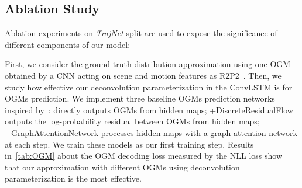 \documentclass[10pt,twocolumn,letterpaper]{article}
\begin{document}
\begin{table}
    \centering
{}
	\vspace{-0.2cm}
	\caption{Results on the inD in the long-term 30-second prediction.}
	\label{tab:inD}
\end{table}


\subsection{Ablation Study}
Ablation experiments on \textit{TrajNet} split are used to expose the significance of different components of our model:

 First, we consider the ground-truth distribution approximation using one OGM obtained by a CNN acting on scene and motion features as R2P2~\cite{rhinehart2018r2p2}. Then, we study how effective our deconvolution parameterization in the ConvLSTM is for OGMs prediction. We implement three baseline OGMs prediction networks inspired by~\cite{ridel2020scene,jain2020discrete,park2020diverse}:  directly outputs OGMs from hidden maps; +DiscreteResidualFlow outputs the log-probability residual between OGMs from hidden maps; +GraphAttentionNetwork processes hidden maps with a graph attention network at each step. We train these models as our first training step. Results in~\cref{tab:OGM} about the OGM decoding loss measured by the NLL loss show that our approximation with different OGMs using deconvolution parameterization is the most effective. 

\begin{table}
    \centering
	\vspace{-0.2cm}
	\caption{Comparison of four baselines and our method with close parameter numbers in predicting OGMs.}
	\label{tab:OGM}
\end{table}
\end{document}

